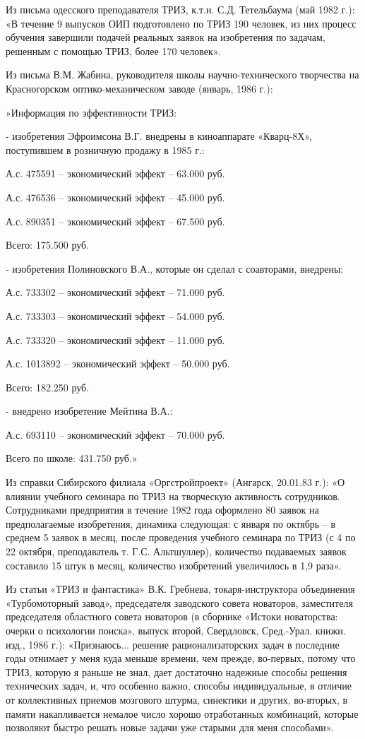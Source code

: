 \documentclass[11pt,a4paper]{article}
\begin{document}
Из письма одесского преподавателя ТРИЗ, к.т.н. С.Д. Тетельбаума (май 1982 г.):
«В течение 9 выпусков ОИП подготовлено по ТРИЗ 190 человек, из них процесс
обучения завершили подачей реальных заявок на изобретения по задачам, решенным
с помощью ТРИЗ, более 170 человек».

Из письма В.М. Жабина, руководителя школы научно-технического творчества на
Красногорском оптико-механическом заводе (январь, 1986 г.):

»Информация по эффективности ТРИЗ:

- изобретения Эфроимсона В.Г. внедрены в киноаппарате «Кварц-8Х», поступившем
в розничную продажу в 1985 г.:

А.с. 475591 -- экономический эффект -- 63.000 руб.

А.с. 476536 -- экономический эффект -- 45.000 руб.

А.с. 890351 -- экономический эффект -- 67.500 руб.

Всего: 175.500 руб.

- изобретения Полиновского В.А., которые он сделал с соавторами, внедрены:

А.с. 733302 -- экономический эффект -- 71.000 руб.

А.с. 733303 -- экономический эффект -- 54.000 руб.

А.с. 733320 -- экономический эффект -- 11.000 руб.

А.с. 1013892 -- экономический эффект -- 50.000 руб.

Всего: 182.250 руб.

- внедрено изобретение Мейтина В.А.:

А.с. 693110 -- экономический эффект -- 70.000 руб.

Всего по школе: 431.750 руб.»

Из справки Сибирского филиала «Оргстройпроект» (Ангарск, 20.01.83 г.): «О
влиянии учебного семинара по ТРИЗ на творческую активность сотрудников.
Сотрудниками предприятия в течение 1982 года оформлено 80 заявок на
предполагаемые изобретения, динамика следующая: с января по октябрь -- в
среднем 5 заявок в месяц, после проведения учебного семинара по ТРИЗ (с 4 по
22 октября, преподаватель т. Г.С. Альтшуллер), количество подаваемых заявок
составило 15 штук в месяц, количество изобретений увеличилось в 1,9 раза».

Из статьи «ТРИЗ и фантастика» В.К. Гребнева, токаря-инструктора объединения
«Турбомоторный завод», председателя заводского совета новаторов, заместителя
председателя областного совета новаторов (в сборнике «Истоки новаторства:
очерки о психологии поиска», выпуск второй, Свердловск,
Сред.-Урал. книжн. изд., 1986 г.): «Признаюсь... решение рационализаторских
задач в последние годы отнимает у меня куда меньше времени, чем прежде,
во-первых, потому что ТРИЗ, которую я раньше не знал, дает достаточно надежные
способы решения технических задач, и, что особенно важно, способы
индивидуальные, в отличие от коллективных приемов мозгового штурма, синектики
и других, во-вторых, в памяти накапливается немалое число хорошо отработанных
комбинаций, которые позволяют быстро решать новые задачи уже старыми для меня
способами».
\end{document}
